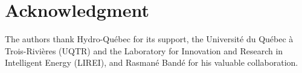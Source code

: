 \documentclass[conference]{IEEEtran}
\begin{document}
\section*{Acknowledgment}
The authors thank Hydro-Québec for its support, the Université du Québec à Trois-Rivières (UQTR) and the Laboratory for Innovation and Research in Intelligent Energy (LIREI), and Rasmané Bandé for his valuable collaboration.



\end{document}
